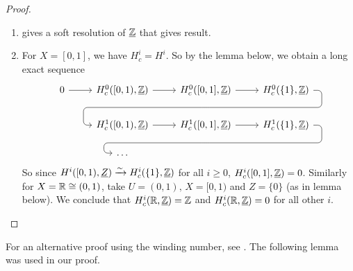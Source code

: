 \documentclass[../main.tex]{subfiles}
\begin{document}
\begin{proof}
    \begin{enumerate}
        \item {} gives a soft resolution of $\underline{\mathbb{Z}}$ that gives result.
        \item  For $X = [0,1]$, we have $H^i_c = H^i$. So by the lemma below, we obtain a long exact sequence
        \[\begin{tikzcd}
            0 \ar[r] & H^0_c([0,1), \underline{\bb Z}) \ar[r] & H^0_c([0,1], \underline{\bb Z}) \ar[r] \ar[draw=none]{d}[name=X, anchor=center]{} & H^0_c(\{1\}, \underline{\bb Z})
            \ar[rounded corners,
            to path={ -- ([xshift=2ex]\tikztostart.east)
                      |- (X.center) \tikztonodes
                      -| ([xshift=-2ex]\tikztotarget.west)
                      -- (\tikztotarget)}]{dll}[at end]{} \\
            & H^1_c([0,1), \underline{\bb Z}) \ar[r] & H^1_c([0,1], \underline{\bb Z}) \ar[r] \ar[draw=none]{d}[name=Y, anchor=center]{} & H^1_c(\{1\}, \underline{\bb Z})
            \ar[rounded corners,
            to path={ -- ([xshift=2ex]\tikztostart.east)
                      |- (Y.center) \tikztonodes
                      -| ([xshift=-2ex]\tikztotarget.west)
                      -- (\tikztotarget)}]{dll}[at end]{} \\
            & \dots & {} & {}
        \end{tikzcd}\]
        So since $H^i([0,1), \underline{Z}) \xrightarrow{\sim} H^i_c(\{1\}, \underline{\mathbb{Z}})$ for all $i\geq 0$, $H^i_c([0,1], \underline{\mathbb{Z}}) = 0$. Similarly for $X = \mathbb{R} \cong (0,1)$, take $U = (0,1),\, X = [0,1)$ and $Z = \{0\}$ (as in lemma below). We conclude that $H^i_c(\mathbb{R}, \underline{\mathbb{Z}}) = \mathbb{Z}$ and $H^i_c(\mathbb{R}, \underline{\mathbb{Z}}) = 0$ for all other $i$. 
        \qedhere
    \end{enumerate}
\end{proof}

For an alternative proof using the winding number, see \cite[Section~\RN{3}.4]{IversenCohomologyOfSheaves}. The following lemma was used in our proof.
\end{document}
